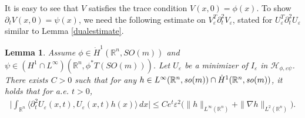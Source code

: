 \documentclass[12pt,twoside,reqno]{amsart}
\newtheorem{lemma}[theorem]{Lemma}
\theoremstyle{definition}              %
\theoremstyle{remark}                  %
\newcommand{\eps}{\varepsilon}
\renewcommand{\1}{\mathbbm{1}}                                      %
\numberwithin{equation}{section}
\numberwithin{definition}{section}
\numberwithin{theorem}{section}
\numberwithin{remark}{section}
\begin{document}
It is easy to see that $V$ satisfies the trace condition
$V(x,0)=\phi(x)$. To show $\partial_t V(x,0)=\psi(x)$, we need
the following estimate on $V_\eps^T \partial_t^2 V_\eps$, stated for $U_\eps^T\partial_t^2U_\eps$ similar to Lemma \ref{dualestimate}. 

\begin{lemma}\label{dualestimate2}
Assume $\phi\in \dot{H}^1(\mathbb R^n,SO(m))$ 
and $\psi\in ({H}^1\cap L^\infty)(\mathbb R^n, \phi^*T(SO(m)))$.
Let $U_\eps$ be a minimizer of $I_\eps$ in $\mathcal{H}_{\phi,\eps\psi}$. There exists  $C>0$ such that for any $h\in L^\infty(\mathbb{R}^n, {\it so}(m))\cap \dot{H}^1(\mathbb{R}^n, {\it so}(m))$,
it holds that for a.e. $t>0$, 
\begin{align}\label{dual_est2}
 \Big|\int_{\mathbb{R}^n} 
 \langle\partial_t^2U_\eps(x,t), U_\eps(x,t) h(x)\rangle\,dx\Big|\le Ce^t\eps^2\Big(\|h\|_{L^\infty(\mathbb {R}^n)}+\|\nabla h\|_{L^2(\mathbb{R}^n)}\Big).
\end{align}    
\end{lemma} 
\end{document}
